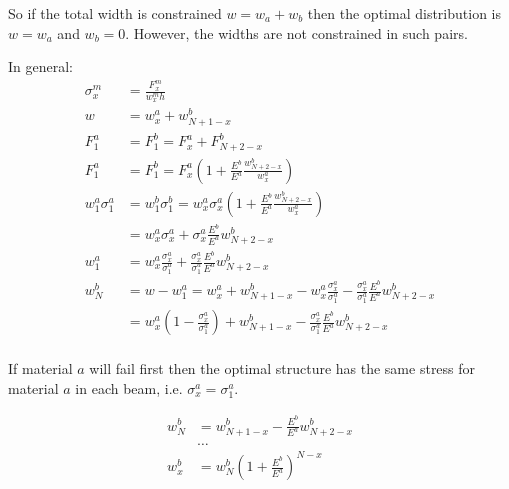 So if the total width is constrained $w = w_a + w_b$ then the optimal distribution is $w = w_a$ and $w_b=0$.
However, the widths are not constrained in such pairs.

In general:
\begin{align*}
    \sigma_x^m &= \frac{F_x^m}{w_x^m h}\\
    w &= w_x^a + w_{N+1-x}^b \\
    F_1^a &= F_1^b = F_x^a + F_{N+2-x}^b \\
    F_1^a &= F_1^b %
     = F_x^a \left( 1 + \frac{E^b}{E^a} \frac{w^b_{N+2-x}}{w^a_x} \right) \\
    w_1^a \sigma_1^a &= w_1^b \sigma_1^b = w_x^a \sigma_x^a \left( 1 + \frac{E^b}{E^a} \frac{w^b_{N+2-x}}{w^a_x} \right) \\
    &= w_x^a \sigma_x^a + \sigma_x^a \frac{E^b}{E^a} w^b_{N+2-x} \\
    w_1^a &= w_x^a \frac{\sigma_x^a}{\sigma_1^a} + \frac{\sigma_x^a}{\sigma_1^a} \frac{E^b}{E^a} w^b_{N+2-x} \\
    w_N^b &= w - w_1^a =  w_x^a + w_{N+1-x}^b  -  w_x^a \frac{\sigma_x^a}{\sigma_1^a} - \frac{\sigma_x^a}{\sigma_1^a} \frac{E^b}{E^a} w^b_{N+2-x} \\
    &= w_x^a \left( 1 - \frac{\sigma_x^a}{\sigma_1^a} \right) + w_{N+1-x}^b - \frac{\sigma_x^a}{\sigma_1^a} \frac{E^b}{E^a} w^b_{N+2-x} \\
\end{align*}

If material $a$ will fail first then the optimal structure has the same stress for material $a$ in each beam, i.e. $\sigma_x^a = \sigma_1^a$.

\begin{align*}
	w_N^b &= w_{N+1-x}^b - \frac{E^b}{E^a} w^b_{N+2-x} \\
	&\dots \\
	w^b_x &= w_N^b \left( 1 + \frac{E^b}{E^a}  \right)^{N-x} \\
\end{align*}

